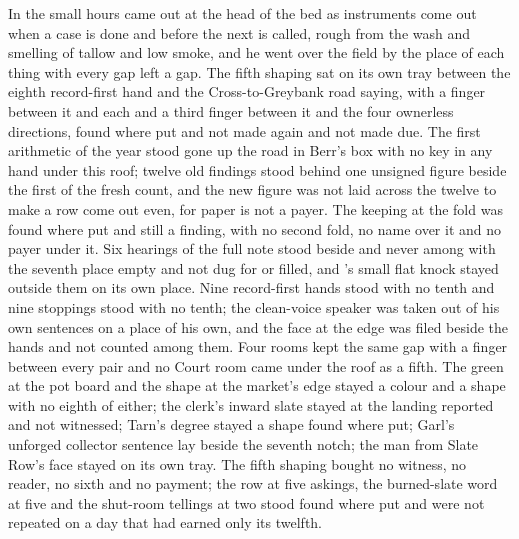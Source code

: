 In the small hours  came out at the head of the bed as instruments come out when a case is done and before the next is called, rough from the wash and smelling of tallow and low smoke, and he went over the field by the place of each thing with every gap left a gap. The fifth shaping sat on its own tray between the eighth record-first hand and the Cross-to-Greybank road saying, with a finger between it and each and a third finger between it and the four ownerless directions, found where put and not made again and not made due. The first arithmetic of the year stood gone up the road in Berr's box with no key in any hand under this roof; twelve old findings stood behind one unsigned figure beside the first of the fresh count, and the new figure was not laid across the twelve to make a row come out even, for paper is not a payer. The keeping at the fold was found where put and still a finding, with no second fold, no name over it and no payer under it. Six hearings of the full note stood beside and never among with the seventh place empty and not dug for or filled, and 's small flat knock stayed outside them on its own place. Nine record-first hands stood with no tenth and nine stoppings stood with no tenth; the clean-voice speaker was taken out of his own sentences on a place of his own, and the face at the edge was filed beside the hands and not counted among them. Four rooms kept the same gap with a finger between every pair and no Court room came under the roof as a fifth. The green at the pot board and the shape at the market's edge stayed a colour and a shape with no eighth of either; the clerk's inward slate stayed at the landing reported and not witnessed; Tarn's degree stayed a shape found where put; Garl's unforged collector sentence lay beside the seventh notch; the man from Slate Row's face stayed on its own tray. The fifth shaping bought no witness, no reader, no sixth and no payment; the row at five askings, the burned-slate word at five and the shut-room tellings at two stood found where put and were not repeated on a day that had earned only its twelfth.

